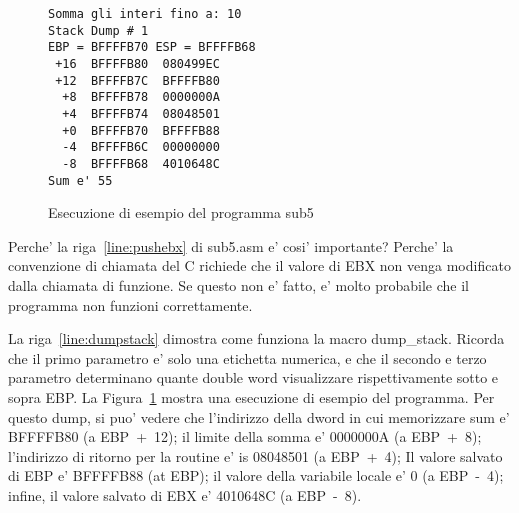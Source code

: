 
\begin{figure}[t]
\begin{Verbatim}[frame=single]
Somma gli interi fino a: 10
Stack Dump # 1
EBP = BFFFFB70 ESP = BFFFFB68
 +16  BFFFFB80  080499EC
 +12  BFFFFB7C  BFFFFB80
  +8  BFFFFB78  0000000A
  +4  BFFFFB74  08048501
  +0  BFFFFB70  BFFFFB88
  -4  BFFFFB6C  00000000
  -8  BFFFFB68  4010648C
Sum e' 55
\end{Verbatim}
\caption{Esecuzione di esempio del programma sub5 \label{fig:dumpstack}}
\end{figure}

Perche' la riga~\ref{line:pushebx} di {\code sub5.asm} e' cosi'
importante? Perche' la convenzione di chiamata del C richiede
che il valore di EBX non venga modificato dalla chiamata di funzione.
Se questo non e' fatto, e' molto probabile che il programma non
funzioni correttamente.

La riga~\ref{line:dumpstack} dimostra come funziona la macro {\code dump\_stack}.
Ricorda che il primo parametro e' solo una etichetta numerica, e che il 
secondo e terzo parametro determinano quante double word visualizzare
rispettivamente sotto e sopra EBP. La Figura~\ref{fig:dumpstack} mostra
una esecuzione di esempio del programma. Per questo dump, si puo' 
vedere che l'indirizzo della dword in cui memorizzare sum e' BFFFFB80 
(a EBP~+~12); il limite della somma e' 0000000A (a EBP~+~8); l'indirizzo
di ritorno per la routine e' is 08048501 (a EBP~+~4); Il valore salvato
di EBP e' BFFFFB88 (at EBP); il valore della variabile locale e' 0 (a EBP~-~4);
infine, il valore salvato di EBX e' 4010648C (a EBP~-~8).


